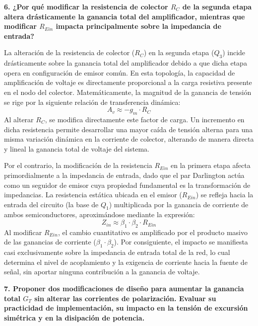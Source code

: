 \textbf{6. ¿Por qué modificar la resistencia de colector $R_C$ de la segunda etapa altera drásticamente la ganancia total del amplificador, mientras que modificar $R_{Ein}$ impacta principalmente sobre la impedancia de entrada?}

La alteración de la resistencia de colector ($R_C$) en la segunda etapa ($Q_3$) incide drásticamente sobre la ganancia total del amplificador debido a que dicha etapa opera en configuración de emisor común. En esta topología, la capacidad de amplificación de voltaje es directamente proporcional a la carga resistiva presente en el nodo del colector. Matemáticamente, la magnitud de la ganancia de tensión se rige por la siguiente relación de transferencia dinámica:
$$A_v \approx -g_m \cdot R_C$$
Al alterar $R_C$, se modifica directamente este factor de carga. Un incremento en dicha resistencia permite desarrollar una mayor caída de tensión alterna para una misma variación dinámica en la corriente de colector, alterando de manera directa y lineal la ganancia total de voltaje del sistema.

Por el contrario, la modificación de la resistencia $R_{Ein}$ en la primera etapa afecta primordialmente a la impedancia de entrada, dado que el par Darlington actúa como un seguidor de emisor cuya propiedad fundamental es la transformación de impedancias. La resistencia estática ubicada en el emisor ($R_{Ein}$) se refleja hacia la entrada del circuito (la base de $Q_1$) multiplicada por la ganancia de corriente de ambos semiconductores, aproximándose mediante la expresión:
$$Z_{in} \approx \beta_1 \cdot \beta_2 \cdot R_{Ein}$$
Al modificar $R_{Ein}$, el cambio cuantitativo es amplificado por el producto masivo de las ganancias de corriente ($\beta_1 \cdot \beta_2$). Por consiguiente, el impacto se manifiesta casi exclusivamente sobre la impedancia de entrada total de la red, lo cual determina el nivel de acoplamiento y la exigencia de corriente hacia la fuente de señal, sin aportar ninguna contribución a la ganancia de voltaje.

\textbf{7. Proponer dos modificaciones de diseño para aumentar la ganancia total $G_T$ sin alterar las corrientes de polarización. Evaluar su practicidad de implementación, su impacto en la tensión de excursión simétrica y en la disipación de potencia.}

